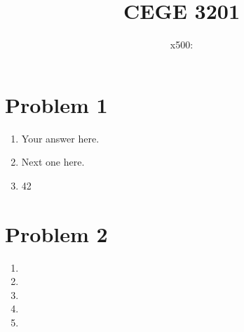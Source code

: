 \documentclass{article}
\title{CEGE 3201 \exerciseset}
\author{\studentname \qquad x500: \suid}
\begin{document}
\maketitle

\section*{Problem 1}
\begin{enumerate}
\item %
Your answer here.

\item %
Next one here.

\item %
42

\end{enumerate}

\section*{Problem 2}
\begin{enumerate}
\item %

\item %

\item %

\item %

\item %

\end{enumerate}
\end{document}
